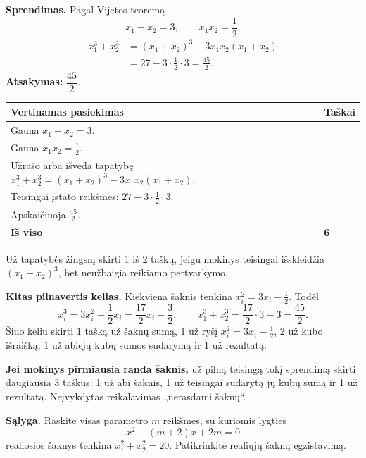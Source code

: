 \documentclass[11pt]{article}
\newcommand{\sk}[1]{\par\medskip{\large\bfseries #1}\par}
\begin{document}
\textbf{Sprendimas.} Pagal Vijetos teoremą
\[
x_1+x_2=3,\qquad x_1x_2=\frac12.
\]
\[
\begin{aligned}
x_1^3+x_2^3
&=(x_1+x_2)^3-3x_1x_2(x_1+x_2)\\
&=27-3\cdot\frac12\cdot3=\frac{45}{2}.
\end{aligned}
\]
\textbf{Atsakymas:} $\dfrac{45}{2}$.
\par\smallskip\renewcommand{\arraystretch}{1.2}\begin{tabularx}{\linewidth}{@{}X>{\centering\arraybackslash}p{1.1cm}@{}}\toprule Vertinamas pasiekimas & Taškai\\\midrule
Gauna $x_1+x_2=3$. & 1\\
Gauna $x_1x_2=\frac12$. & 1\\
Užrašo arba išveda tapatybę $x_1^3+x_2^3=(x_1+x_2)^3-3x_1x_2(x_1+x_2)$. & 2\\
Teisingai įstato reikšmes: $27-3\cdot\frac12\cdot3$. & 1\\
Apskaičiuoja $\frac{45}{2}$. & 1\\
\textbf{Iš viso} & \textbf{6}\\
\bottomrule\end{tabularx}\par
Už tapatybės žingsnį skirti 1 iš 2 taškų, jeigu mokinys teisingai išskleidžia $(x_1+x_2)^3$, bet neužbaigia reikiamo pertvarkymo.

\textbf{Kitas pilnavertis kelias.} Kiekviena šaknis tenkina $x_i^2=3x_i-\frac12$. Todėl
\[
x_i^3=3x_i^2-\frac12x_i=\frac{17}{2}x_i-\frac32,
\qquad
x_1^3+x_2^3=\frac{17}{2}\cdot3-3=\frac{45}{2}.
\]
Šiuo keliu skirti 1 tašką už šaknų sumą, 1 už ryšį $x_i^2=3x_i-\frac12$, 2 už kubo išraišką, 1 už abiejų kubų sumos sudarymą ir 1 už rezultatą.

\textbf{Jei mokinys pirmiausia randa šaknis,} už pilną teisingą tokį sprendimą skirti daugiausia 3 taškus: 1 už abi šaknis, 1 už teisingai sudarytą jų kubų sumą ir 1 už rezultatą. Neįvykdytas reikalavimas „nerasdami šaknų“.

\newpage
\sk{3 uždavinys -- 8 taškai}
\textbf{Sąlyga.} Raskite visas parametro $m$ reikšmes, su kuriomis lygties
\[
x^2-(m+2)x+2m=0
\]
realiosios šaknys tenkina $x_1^2+x_2^2=20$. Patikrinkite realiųjų šaknų egzistavimą.
\end{document}
